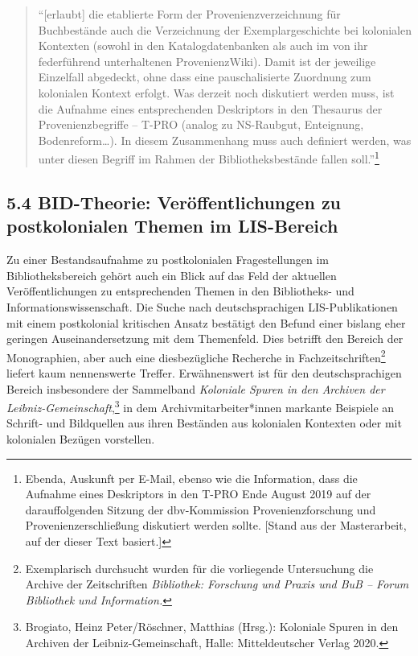 \documentclass[a4paper,
fontsize=11pt,
oneside,
numbers=noperiodatend,
parskip=half-,
bibliography=totoc,
final
]{scrartcl}
\begin{document}
\begin{quote}
\enquote{{[}erlaubt{]} die etablierte Form der Provenienzverzeichnung
für Buchbestände auch die Verzeichnung der Exemplargeschichte bei
kolonialen Kontexten (sowohl in den Katalogdatenbanken als auch im von
ihr federführend unterhaltenen ProvenienzWiki). Damit ist der jeweilige
Einzelfall abgedeckt, ohne dass eine pauschalisierte Zuordnung zum
kolonialen Kontext erfolgt. Was derzeit noch diskutiert werden muss, ist
die Aufnahme eines entsprechenden Deskriptors in den Thesaurus der
Provenienzbegriffe -- T-PRO (analog zu NS-Raubgut, Enteignung,
Bodenreform\ldots). In diesem Zusammenhang muss auch definiert werden,
was unter diesen Begriff im Rahmen der Bibliotheksbestände fallen
soll.}\footnote{Ebenda, Auskunft per E-Mail, ebenso wie die Information,
  dass die Aufnahme eines Deskriptors in den T-PRO Ende August 2019 auf
  der darauffolgenden Sitzung der dbv-Kommission Provenienzforschung und
  Provenienzerschließung diskutiert werden sollte. {[}Stand aus der
  Masterarbeit, auf der dieser Text basiert.{]}}
\end{quote}

\hypertarget{bid-theorie-veruxf6ffentlichungen-zu-postkolonialen-themen-im-lis-bereich}{%
\subsection{5.4 BID-Theorie: Veröffentlichungen zu postkolonialen Themen
im
LIS-Bereich}\label{bid-theorie-veruxf6ffentlichungen-zu-postkolonialen-themen-im-lis-bereich}}

Zu einer Bestandsaufnahme zu postkolonialen Fragestellungen im
Bibliotheksbereich gehört auch ein Blick auf das Feld der aktuellen
Veröffentlichungen zu entsprechenden Themen in den Bibliotheks- und
Informationswissenschaft. Die Suche nach deutschsprachigen
LIS-Publikationen mit einem postkolonial kritischen Ansatz bestätigt den
Befund einer bislang eher geringen Auseinandersetzung mit dem
Themenfeld. Dies betrifft den Bereich der Monographien, aber auch eine
diesbezügliche Recherche in Fachzeitschriften\footnote{Exemplarisch
  durchsucht wurden für die vorliegende Untersuchung die Archive der
  Zeitschriften \emph{Bibliothek: Forschung und Praxis und BuB -- Forum
  Bibliothek und Information.}} liefert kaum nennenswerte Treffer.
Erwähnenswert ist für den deutschsprachigen Bereich insbesondere der
Sammelband \emph{Koloniale Spuren in den Archiven der
Leibniz-Gemeinschaft},\footnote{Brogiato, Heinz Peter/Röschner, Matthias
  (Hrsg.): Koloniale Spuren in den Archiven der Leibniz-Gemeinschaft,
  Halle: Mitteldeutscher Verlag 2020.} in dem Archivmitarbeiter*innen
markante Beispiele an Schrift- und Bildquellen aus ihren Beständen aus
kolonialen Kontexten oder mit kolonialen Bezügen vorstellen.
\end{document}
